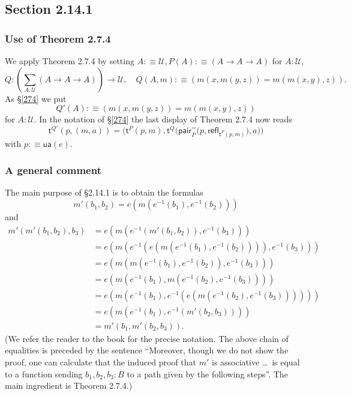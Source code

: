 \documentclass[12pt]{article}
\newcommand{\msf}{\mathsf}
\newcommand{\de}{:\equiv}
\newcommand{\pa}{\mathsf{pair}^=}
\newcommand{\refl}{\mathsf{refl}}
\newcommand{\U}{\mathcal U}
\begin{document}

\subsection{Section 2.14.1}

\subsubsection{Use of Theorem 2.7.4}

We apply Theorem 2.7.4 by setting $A\de\U,P(A)\de(A\to A\to A)$ for $A:\U$, 
$$
Q:\left(\sum_{A:\U}(A\to A\to A)\right)\to\U,\quad Q(A,m)\de(m(x,m(y,z))=m(m(x,y),z)).
$$ 
As \S\ref{274} we put 
$$
Q'(A)\de(m(x,m(y,z))=m(m(x,y),z))
$$ 
for $A:\U$. In the notation of \S\ref{274} the last display of Theorem 2.7.4 now reads 
$$
\msf t^{Q'}(p,(m,a))=\Bigg(\msf t^P(p,m),\msf t^Q\bigg(\pa_P\Big(p,\refl_{\msf t^P(p,m)}\Big),a\bigg)\Bigg)
$$ 
with $p\de\msf{ua}(e)$.

\subsubsection{A general comment}

The main purpose of \S2.14.1 is to obtain the formulas
$$
m'(b_1,b_2)=e(m(e^{-1}(b_1),e^{-1}(b_2)))
$$ 
and
\begin{equation*}
  \begin{aligned}
    m'(m'(b_1,b_2),b_3)
    &= e(m(e^{-1}(m'(b_1,b_2)),e^{-1}(b_3))) \\
    &= e(m(e^{-1}(e(m(e^{-1}(b_1),e^{-1}(b_2)))),e^{-1}(b_3))) \\
    &= e(m(m(e^{-1}(b_1),e^{-1}(b_2)),e^{-1}(b_3))) \\
    &= e(m(e^{-1}(b_1),m(e^{-1}(b_2),e^{-1}(b_3)))) \\
    &= e(m(e^{-1}(b_1),e^{-1}(e(m(e^{-1}(b_2),e^{-1}(b_3)))))) \\
    &= e(m(e^{-1}(b_1),e^{-1}(m'(b_2,b_3)))) \\
    &= m'(b_1,m'(b_2,b_3)).
\end{aligned}
\end{equation*}
(We refer the reader to the book for the precise notation. The above chain of equalities is preceded by the sentence ``Moreover, though we do not show the proof, one can calculate that the induced proof that $m'$ is associative \dots\ is equal to a function sending $b_1,b_2,b_3:B$ to a path given by the following steps''. The main ingredient is Theorem 2.7.4.)
\end{document}
